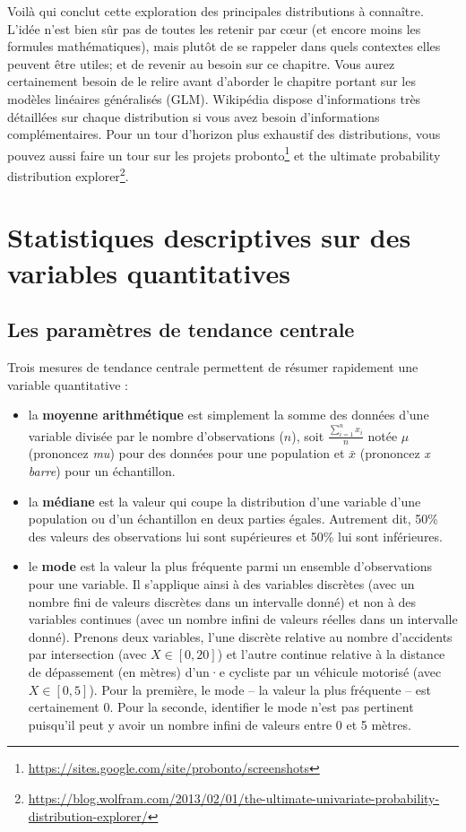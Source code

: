 \documentclass[
  11pt,
  french,
]{book}
\providecommand{\tightlist}{%
  \setlength{\itemsep}{0pt}\setlength{\parskip}{0pt}}
\renewcommand{\href}[2]{#2\footnote{\url{#1}}}
\begin{document}
Voilà qui conclut cette exploration des principales distributions à connaître. L'idée n'est bien sûr pas de toutes les retenir par cœur (et encore moins les formules mathématiques), mais plutôt de se rappeler dans quels contextes elles peuvent être utiles; et de revenir au besoin sur ce chapitre. Vous aurez certainement besoin de le relire avant d'aborder le chapitre portant sur les modèles linéaires généralisés (GLM).
Wikipédia dispose d'informations très détaillées sur chaque distribution si vous avez besoin d'informations complémentaires. Pour un tour d'horizon plus exhaustif des distributions, vous pouvez aussi faire un tour sur les projets \href{https://sites.google.com/site/probonto/screenshots}{probonto} et \href{https://blog.wolfram.com/2013/02/01/the-ultimate-univariate-probability-distribution-explorer/}{the ultimate probability distribution explorer}.

\hypertarget{sect025}{%
\section{Statistiques descriptives sur des variables quantitatives}\label{sect025}}

\hypertarget{sect0251}{%
\subsection{Les paramètres de tendance centrale}\label{sect0251}}

Trois mesures de tendance centrale permettent de résumer rapidement une variable quantitative :

\begin{itemize}
\tightlist
\item
  la \textbf{moyenne arithmétique} est simplement la somme des données d'une variable divisée par le nombre d'observations (\(n\)), soit \(\frac{\sum_{i=1}^n x_i}{n}\) notée \(\mu\) (prononcez \emph{mu}) pour des données pour une population et \(\bar{x}\) (prononcez \emph{x barre}) pour un échantillon.
\item
  la \textbf{médiane} est la valeur qui coupe la distribution d'une variable d'une population ou d'un échantillon en deux parties égales. Autrement dit, 50\% des valeurs des observations lui sont supérieures et 50\% lui sont inférieures.
\item
  le \textbf{mode} est la valeur la plus fréquente parmi un ensemble d'observations pour une variable. Il s'applique ainsi à des variables discrètes (avec un nombre fini de valeurs discrètes dans un intervalle donné) et non à des variables continues (avec un nombre infini de valeurs réelles dans un intervalle donné). Prenons deux variables, l'une discrète relative au nombre d'accidents par intersection (avec \(X \in \left[0,20\right]\)) et l'autre continue relative à la distance de dépassement (en mètres) d'un·e cycliste par un véhicule motorisé (avec \(X \in \left[0,5\right]\)). Pour la première, le mode -- la valeur la plus fréquente -- est certainement 0. Pour la seconde, identifier le mode n'est pas pertinent puisqu'il peut y avoir un nombre infini de valeurs entre 0 et 5 mètres.
\end{itemize}
\end{document}
